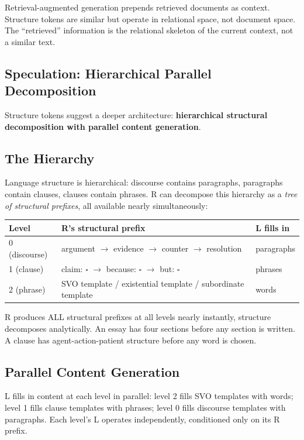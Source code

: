 \documentclass[11pt, a4paper]{article}
\theoremstyle{plain}
\theoremstyle{definition}
\theoremstyle{remark}
\begin{document}
Retrieval-augmented generation prepends retrieved documents as context.
Structure tokens are similar but operate in relational space, not document space.
The ``retrieved'' information is the relational skeleton of the current context, not a similar text.

\subsection{Speculation: Hierarchical Parallel Decomposition}
\label{app:hierarchical-parallel}

Structure tokens suggest a deeper architecture: \textbf{hierarchical structural decomposition with parallel content generation}.

\subsection{The Hierarchy}

Language structure is hierarchical: discourse contains paragraphs, paragraphs contain clauses, clauses contain phrases.
R can decompose this hierarchy as a \emph{tree of structural prefixes}, all available nearly simultaneously:

\begin{center}\small
\begin{tabular}{lll}
\toprule
\textbf{Level} & \textbf{R's structural prefix} & \textbf{L fills in} \\
\midrule
0 (discourse) & argument $\to$ evidence $\to$ counter $\to$ resolution & paragraphs \\
1 (clause) & claim: $\square$ $\to$ because: $\square$ $\to$ but: $\square$ & phrases \\
2 (phrase) & SVO template / existential template / subordinate template & words \\
\bottomrule
\end{tabular}
\end{center}

R produces ALL structural prefixes at all levels nearly instantly, structure decomposes analytically.
An essay has four sections before any section is written.
A clause has agent-action-patient structure before any word is chosen.

\subsection{Parallel Content Generation}

L fills in content at each level in parallel:
level 2 fills SVO templates with words;
level 1 fills clause templates with phrases;
level 0 fills discourse templates with paragraphs.
Each level's L operates independently, conditioned only on its R prefix.
\end{document}
